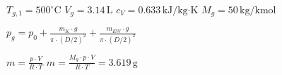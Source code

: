 \( T_{g,1} = 500^\circ \text{C} \)  
\( V_g = 3.14 \, \text{L} \)  
\( c_V = 0.633 \, \text{kJ/kg·K} \)  
\( M_g = 50 \, \text{kg/kmol} \)  

\( p_g = p_0 + \frac{m_K \cdot g}{\pi \cdot (D/2)^2} + \frac{m_{EW} \cdot g}{\pi \cdot (D/2)^2} \)  

\( m = \frac{p \cdot V}{R \cdot T} \)  
\( m = \frac{M_g \cdot p \cdot V}{R \cdot T} = 3.619 \, \text{g} \)